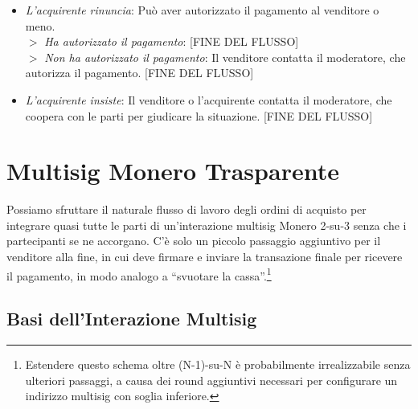 \begin{enumerate}
\begin{itemize}
\begin{enumerate}
\begin{itemize}
\begin{itemize}
\begin{itemize}
                        \item {\em L'acquirente rinuncia}: Può aver autorizzato il pagamento al venditore o meno.\\
                        $>$ {\em Ha autorizzato il pagamento}: [FINE DEL FLUSSO]\\
                        $>$ {\em Non ha autorizzato il pagamento}: Il venditore contatta il moderatore, che autorizza il pagamento. [FINE DEL FLUSSO]
                        \item {\em L'acquirente insiste}: Il venditore o l'acquirente contatta il moderatore, che coopera con le parti per giudicare la situazione. [FINE DEL FLUSSO]
                    \end{itemize}{}
                \end{itemize}
            \end{itemize}{}
        \end{enumerate}{}
    \end{itemize}{}
\end{enumerate}{}



\section{Multisig Monero Trasparente}
\label{sec:escrowed-marketplace-seamless-multisig}

Possiamo sfruttare il naturale flusso di lavoro degli ordini di acquisto per integrare quasi tutte le parti di un'interazione multisig Monero 2-su-3 senza che i partecipanti se ne accorgano. C'è solo un piccolo passaggio aggiuntivo per il venditore alla fine, in cui deve firmare e inviare la transazione finale per ricevere il pagamento, in modo analogo a ``svuotare la cassa''.\footnote{Estendere questo schema oltre (N-1)-su-N è probabilmente irrealizzabile senza ulteriori passaggi, a causa dei round aggiuntivi necessari per configurare un indirizzo multisig con soglia inferiore.}


\subsection{Basi dell'Interazione Multisig}
\label{subsec:escrowed-marketplace-multisig-interaction-basics}


